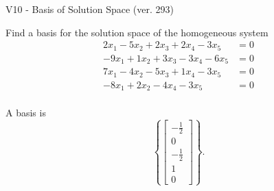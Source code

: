 \begin{exercise}
  \begin{exerciseTitle}V10 - Basis of Solution Space (ver. 293)\end{exerciseTitle}
  \begin{exerciseStatement}
    Find a basis for the solution space of the homogeneous system 
\begin{align*}
 2 x_ 1 -5 x_ 2 + 2 x_ 3 + 2 x_ 4 -3 x_ 5 &= 0  \\ 
  -9 x_ 1 + 1 x_ 2 + 3 x_ 3 -3 x_ 4 -6 x_ 5 &= 0  \\ 
  7 x_ 1 -4 x_ 2 -5 x_ 3 + 1 x_ 4 -3 x_ 5 &= 0  \\ 
  -8 x_ 1 + 2 x_ 2 -4 x_ 4 -3 x_ 5 &= 0  \\ 
 \end{align*}


 
  \end{exerciseStatement}

  \begin{exerciseAnswer}
   A basis is   
\[\left\{\left[\begin{array}{c}
-\frac{1}{2} \\
0 \\
-\frac{1}{2} \\
1 \\
0
\end{array}\right]\right\}.\]

  


  \end{exerciseAnswer}
\end{exercise}